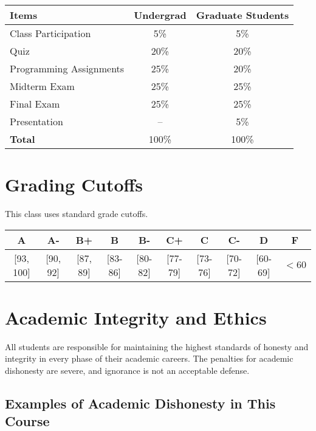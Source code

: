 \documentclass[11pt,letterpaper]{article}
\begin{document}
\begin{table}[h]
\centering
\begin{tabular}{lcc}
\toprule
\textbf{Items} & \textbf{Undergrad} & \textbf{Graduate Students} \\
\midrule
Class Participation & 5\% & 5\% \\
Quiz & 20\% & 20\% \\
Programming Assignments & 25\% & 20\% \\
Midterm Exam & 25\% & 25\% \\
Final Exam & 25\% & 25\% \\
Presentation & -- & 5\% \\
\midrule
\textbf{Total} & 100\% & 100\% \\
\bottomrule
\end{tabular}
\end{table}

\section*{Grading Cutoffs}

This class uses standard grade cutoffs.

\begin{table}[h]
\centering
\begin{tabular}{|c|c|c|c|c|c|c|c|c|c|}
\hline
\textbf{A} & \textbf{A-} & \textbf{B+} & \textbf{B} & \textbf{B-} & \textbf{C+} & \textbf{C} & \textbf{C-} & \textbf{D} & \textbf{F} \\
\hline
{[}93, 100{]} & {[}90, 92{]} & {[}87, 89{]} & {[}83-86{]} & {[}80-82{]} & {[}77-79{]} & {[}73-76{]} & {[}70-72{]} & {[}60-69{]} & $< 60$ \\
\hline
\end{tabular}
\end{table}

\section*{Academic Integrity and Ethics}

All students are responsible for maintaining the highest standards of honesty and integrity in every phase of their academic careers. The penalties for academic dishonesty are severe, and ignorance is not an acceptable defense.

\subsection*{Examples of Academic Dishonesty in This Course}
\end{document}
